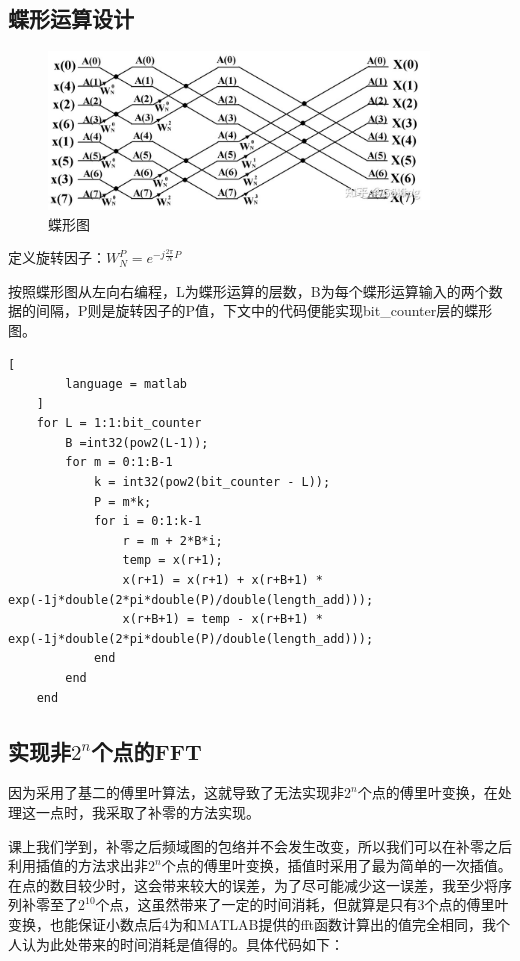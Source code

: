 \documentclass{../source/zju}
\begin{document}
    \subsection{蝶形运算设计}
    \begin{figure}[thp]
        \centering
        \includegraphics[width = 0.9\textwidth]{figure/蝶形图.jpg}
        \caption{蝶形图}
    \end{figure}
    定义旋转因子：$W_N^P = e^{-j\frac{2\pi}{N}P}$

    按照蝶形图从左向右编程，L为蝶形运算的层数，B为每个蝶形运算输入的两个数据的间隔，P则是旋转因子的P值，下文中的代码便能实现bit_counter层的蝶形图。
    \begin{lstlisting}[
        language = matlab
    ]
    for L = 1:1:bit_counter
        B =int32(pow2(L-1));
        for m = 0:1:B-1
            k = int32(pow2(bit_counter - L));
            P = m*k;
            for i = 0:1:k-1
                r = m + 2*B*i;
                temp = x(r+1);
                x(r+1) = x(r+1) + x(r+B+1) * exp(-1j*double(2*pi*double(P)/double(length_add)));
                x(r+B+1) = temp - x(r+B+1) * exp(-1j*double(2*pi*double(P)/double(length_add)));               
            end
        end
    end
    \end{lstlisting}


    \subsection{实现非$2^n$个点的FFT}
    因为采用了基二的傅里叶算法，这就导致了无法实现非$2^n$个点的傅里叶变换，在处理这一点时，我采取了补零的方法实现。

    课上我们学到，补零之后频域图的包络并不会发生改变，所以我们可以在补零之后利用插值的方法求出非$2^n$个点的傅里叶变换，插值时采用了最为简单的一次插值。在点的数目较少时，这会带来较大的误差，为了尽可能减少这一误差，我至少将序列补零至了$2^{10}$个点，这虽然带来了一定的时间消耗，但就算是只有3个点的傅里叶变换，也能保证小数点后4为和MATLAB提供的fft函数计算出的值完全相同，我个人认为此处带来的时间消耗是值得的。具体代码如下：
\end{document}
